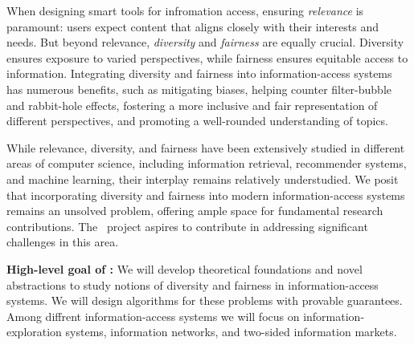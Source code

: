 \documentclass[a4paper,11pt]{article}
\begin{document}

When designing smart tools for infromation access, ensuring \emph{relevance} is paramount:
users expect content that aligns closely with their interests and needs.
But beyond relevance, \emph{diversity} and \emph{fairness} are equally crucial.
Diversity ensures exposure to varied perspectives, 
while fairness ensures equitable access to information.
Integrating diversity and fairness into information-access systems has numerous benefits, 
such as mitigating biases, 
helping counter filter-bubble and rabbit-hole effects, 
fostering a more inclusive and fair representation of different perspectives, and 
promoting a well-rounded understanding of topics.

While relevance, diversity, and fairness
have been extensively studied in different areas of computer science, 
including information retrieval, recommender systems, and machine learning,
their interplay remains relatively understudied.
We posit that incorporating diversity and fairness into modern information-access systems
remains an unsolved problem, 
offering ample space for fundamental research contributions.
The \acronym\ project aspires to contribute in addressing 
significant challenges in this area. 

\medskip
\noindent
\hspace{-3mm}\colorbox{verylightmagenta}{
\begin{minipage}{\textwidth}
{\bf High-level goal of \acronym:} 
We will develop theoretical foundations and novel abstractions to 
study notions of diversity and fairness in information-access systems.
We will design algorithms for these problems with provable guarantees.
Among diffrent information-access systems we will focus on 
information-exploration systems, information networks, and two-sided information markets.
\end{minipage}}

\end{document}
